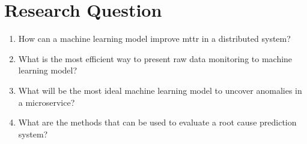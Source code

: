 
\section{Research Question}


\begin{enumerate}[leftmargin=*,label=\textbf{RQ\arabic*:}]

\item How can a machine learning model improve \ac{mttr} in a distributed system?

\item What is the most efficient way to present raw data monitoring to machine learning model?

\item What will be the most ideal machine learning model to uncover anomalies in a microservice?

\item What are the methods that can be used to evaluate a root cause prediction system?

\end{enumerate}


